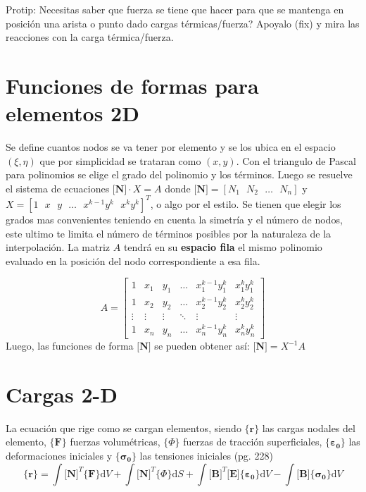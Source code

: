 \documentclass[11pt, a4paper,titlepage]{article}
\newcommand{\ms}{\ \ \ } %
\newcommand{\di}{\textrm{d}}
\newcommand{\sigmab}{\boldsymbol{\sigma}}
\newcommand{\varepsilonb}{\boldsymbol{\varepsilon}}
\newcommand{\CPhi}{\boldsymbol{\{ } \Phi \boldsymbol{\} }}
\newcommand{\Mme}[1]{\boldsymbol{[}\mathbf{#1} \boldsymbol{]}}
\newcommand{\Cme}[1]{\boldsymbol{\{ }\mathbf{#1} \boldsymbol{\}} }
\newcommand{\MB}{\Mme{B}}
\newcommand{\MN}{\Mme{N}}
\newcommand{\ME}{\Mme{E}}
\begin{document}
Protip: Necesitas saber que fuerza se tiene que hacer para que se mantenga en posición una arista o punto dado cargas térmicas/fuerza? Apoyalo (fix) y mira las reacciones con la carga térmica/fuerza.






\section{Funciones de formas para elementos 2D}
Se define cuantos nodos se va tener por elemento y se los ubica en el espacio $(\xi,\eta)$ que por simplicidad se trataran como $(x,y)$. Con el triangulo de Pascal para polinomios se elige el grado del polinomio y los términos. Luego se resuelve el sistema de ecuaciones $\MN\cdot X= A$ donde $\MN=[N_1\ms N_2 \ms \ldots\ms N_n]$ y $X=[1\ms x\ms y \ms\ldots\ms x^{k-1}y^{k} \ms x^{k}y^{k}]^T$, o algo por el estilo. Se tienen que elegir los grados mas convenientes teniendo en cuenta la simetría y el número de nodos, este ultimo te limita el número de términos posibles por la naturaleza de la interpolación. La matriz $A$ tendrá en su \textbf{espacio fila} el mismo polinomio evaluado en la posición del nodo correspondiente a esa fila.

\[
A=
\begin{bmatrix}
    1 & x_1 & y_1 & \dots  & x_{1}^{k-1}y_1^{k} & x_{1}^{k}y_1^{k} \\
    1 & x_2 & y_2 & \dots  & x_{2}^{k-1}y_2^{k} & x_{2}^{k}y_2^{k} \\
    \vdots & \vdots & \vdots & \ddots & \vdots& \vdots \\
    1 & x_n & y_n & \dots  & x_{n}^{k-1}y_n^{k} & x_{n}^{k}y_n^{k}
\end{bmatrix}
\]
Luego, las funciones de forma $\MN$ se pueden obtener así: $\MN=X^{-1} A$

\section*{Cargas 2-D}
La ecuación que rige como se cargan elementos, siendo $\Cme{r}$ las cargas nodales del elemento, $\Cme{F}$ fuerzas volumétricas, $\CPhi$ fuerzas de tracción superficiales, $\Cme{\varepsilonb_0}$ las deformaciones iniciales y $\Cme{\sigmab_0}$ las tensiones iniciales (pg. 228)
\begin{equation} \label{eq:CargasGenerales}
\Cme{r}=\int \MN^T \Cme{F} \di V +\int \MN^T \CPhi \di S+\int \MB^T \ME \Cme{\varepsilonb_0} \di V- \int \MB \Cme{\sigmab_0} \di V
\end{equation}
\end{document}
